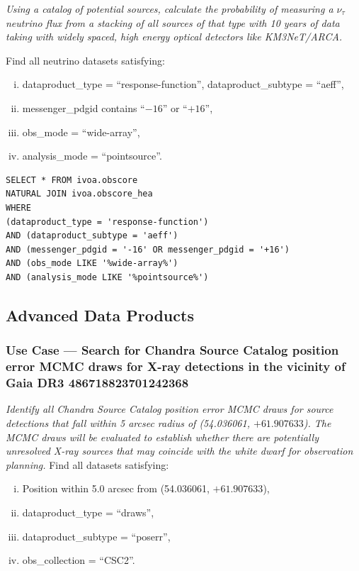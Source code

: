 {\em Using a catalog of potential sources, calculate the probability of measuring a $\nu_{\tau}$ neutrino flux from a stacking of all sources of that type with 10 years of data taking with widely spaced, high energy optical detectors like KM3NeT/ARCA.}

\medskip
\noindent Find all neutrino datasets satisfying:
\begin{enumerate}[(i)]
  \item dataproduct\_type = ``response-function'', dataproduct\_subtype = ``aeff'',
  \item messenger\_pdgid contains ``$-16$'' or ``$+16$'',
  \item obs\_mode = ``wide-array'',
  \item analysis\_mode = ``pointsource''.
\end{enumerate}

\begin{verbatim}
SELECT * FROM ivoa.obscore
NATURAL JOIN ivoa.obscore_hea
WHERE
(dataproduct_type = 'response-function')
AND (dataproduct_subtype = 'aeff')
AND (messenger_pdgid = '-16' OR messenger_pdgid = '+16')
AND (obs_mode LIKE '%wide-array%')
AND (analysis_mode LIKE '%pointsource%')
\end{verbatim}

\subsection{Advanced Data Products}

\subsubsection{Use Case --- Search for Chandra Source Catalog position error MCMC draws for X-ray detections in the vicinity of Gaia DR3 486718823701242368}

{\em Identify all Chandra Source Catalog position error MCMC draws for source detections that fall within 5 arcsec radius of  (54.036061, $+61.907633$).  The MCMC draws will be evaluated to establish whether there are potentially unresolved X-ray sources that may coincide with the white dwarf for observation planning.\/}
\medskip
\noindent Find all datasets satisfying:
\begin{enumerate}[(i)]
  \item Position within 5.0 arcsec from (54.036061, $+61.907633$),
  \item dataproduct\_type = ``draws'',
  \item dataproduct\_subtype = ``poserr'',
  \item obs\_collection = ``CSC2''.
\end{enumerate}

